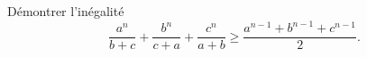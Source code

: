 Démontrer l'inégalité
\[ \frac{a^n}{b + c} + \frac{b^n}{c + a} + \frac{c^n}{a + b} \geq \frac{a^{n-1} + b^{n-1} + c^{n-1}}{2}. \]
